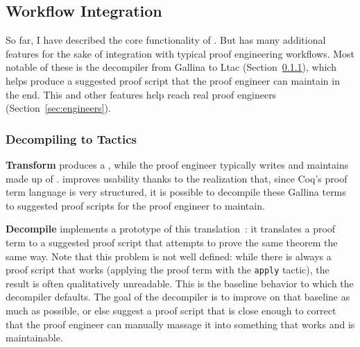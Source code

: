 \subsection{Workflow Integration}
\label{sec:pi-workflow}

So far, I have described the core functionality of \toolnamec.
But \toolnamec has many additional features for the sake of integration with typical proof engineering workflows.
Most notable of these is the decompiler from Gallina to Ltac (Section~\ref{sec:decompiler}),
which helps \toolnamec produce a suggested proof script that the proof engineer can maintain in the end.
This and other features help \toolnamec reach real proof engineers (Section~\ref{sec:engineers}).

\subsubsection{Decompiling to Tactics}
\label{sec:decompiler}

\textbf{Transform} produces a ,
while the proof engineer typically writes and maintains  made up of .
\toolnamec improves usability thanks to the realization that, since Coq's proof term language  is very structured,
it is possible to decompile these Gallina terms to suggested  proof scripts for the proof engineer 
to maintain.



\textbf{Decompile} implements a prototype of this translation~\href{https://github.com/uwplse/coq-plugin-lib/tree/9ef05815c261de9c99b604c6b581ba1c4fbc1a46/src/coq/decompiler/decompiler.ml}{}: %
it translates a proof term to a suggested proof script that attempts to prove the same theorem 
the same way.
Note that this problem is not well defined: while there is always a proof script that 
works (applying the proof term with the \lstinline{apply} tactic), the result is often qualitatively unreadable.
This is the baseline behavior to which the decompiler defaults.
The goal of the decompiler is to improve on that baseline as much as possible,
or else suggest a proof script that is close enough to correct that the proof engineer can
manually massage it into something that works and is maintainable.

